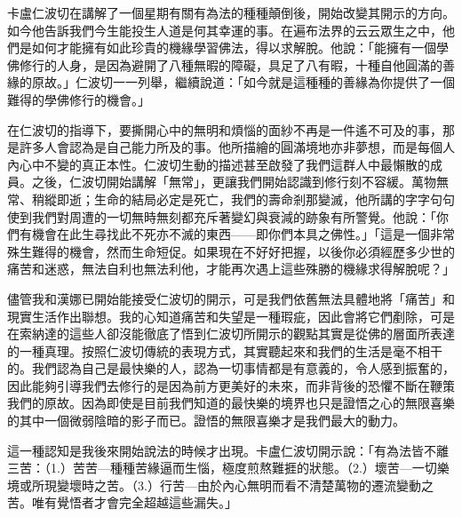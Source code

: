 卡盧仁波切在講解了一個星期有關有為法的種種顛倒後，開始改變其開示的方向。如今他告訴我們今生能投生人道是何其幸運的事。在遍布法界的云云眾生之中，他們是如何才能擁有如此珍貴的機緣學習佛法，得以求解脫。他說：「能擁有一個學佛修行的人身，是因為避開了八種無暇的障礙，具足了八有暇，十種自他圓滿的善緣的原故。」仁波切一一列舉，繼續說道：「如今就是這種種的善緣為你提供了一個難得的學佛修行的機會。」

在仁波切的指導下，要撕開心中的無明和煩惱的面紗不再是一件遙不可及的事，那是許多人會認為是自己能力所及的事。他所描繪的圓滿境地亦非夢想，而是每個人內心中不變的真正本性。仁波切生動的描述甚至啟發了我們這群人中最懶散的成員。之後，仁波切開始講解「無常」，更讓我們開始認識到修行刻不容緩。萬物無常、稍縱即逝；生命的結局必定是死亡，我們的壽命剎那變滅，他所講的字字句句使到我們對周遭的一切無時無刻都充斥著變幻與衰減的跡象有所警覺。他說：「你們有機會在此生尋找此不死亦不滅的東西——即你們本具之佛性。」「這是一個非常殊生難得的機會，然而生命短促。如果現在不好好把握，以後你必須經歷多少世的痛苦和迷惑，無法自利也無法利他，才能再次遇上這些殊勝的機緣求得解脫呢？」

儘管我和漢娜已開始能接受仁波切的開示，可是我們依舊無法具體地將「痛苦」和現實生活作出聯想。我的心知道痛苦和失望是一種瑕疵，因此會將它們剷除，可是在索納達的這些人卻沒能徹底了悟到仁波切所開示的觀點其實是從佛的層面所表達的一種真理。按照仁波切傳統的表現方式，其實聽起來和我們的生活是毫不相干的。我們認為自己是最快樂的人，認為一切事情都是有意義的，令人感到振奮的，因此能夠引導我們去修行的是因為前方更美好的未來，而非背後的恐懼不斷在鞭策我們的原故。因為即使是目前我們知道的最快樂的境界也只是證悟之心的無限喜樂的其中一個微弱陰暗的影子而已。證悟的無限喜樂才是我們最大的動力。

這一種認知是我後來開始說法的時候才出現。卡盧仁波切開示說：「有為法皆不離三苦：（1.）苦苦---種種苦緣逼而生惱，極度煎熬難捱的狀態。（2.）壞苦---一切樂境或所現變壞時之苦。（3.）行苦---由於內心無明而看不清楚萬物的遷流變動之苦。唯有覺悟者才會完全超越這些漏失。」
